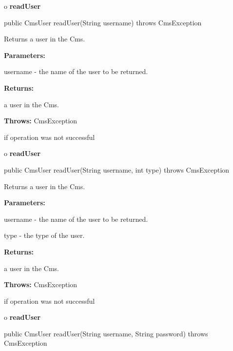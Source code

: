 o {\bf readUser}

\begin{PRE}
 public CmsUser readUser(String username) throws CmsException
\end{PRE}

\begin{description}
\htmlDD Returns a user in the Cms.

\begin{description}
\item {\bf Parameters:}

username - the name of the user to be returned.
\item {\bf Returns:}

a user in the Cms.
\item {\bf Throws:} CmsException

if operation was not successful
\end{description}

\end{description}

o {\bf readUser}

\begin{PRE}
 public CmsUser readUser(String username,
                         int type) throws CmsException
\end{PRE}

\begin{description}
\htmlDD Returns a user in the Cms.

\begin{description}
\item {\bf Parameters:}

username - the name of the user to be returned.

type - the type of the user.
\item {\bf Returns:}

a user in the Cms.
\item {\bf Throws:} CmsException

if operation was not successful
\end{description}

\end{description}

o {\bf readUser}

\begin{PRE}
 public CmsUser readUser(String username,
                         String password) throws CmsException
\end{PRE}

